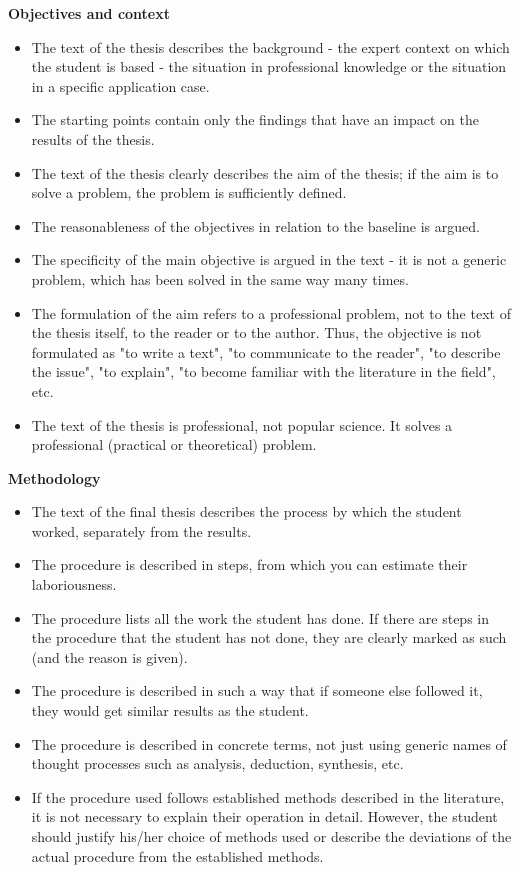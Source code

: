 {\bfseries\sffamily\Large Objectives and context}
\begin{itemize}
\item \vspace*{-2ex}The text of the thesis describes the background - the expert context on which the student is based - the situation in professional knowledge or the situation in a specific application case.
\item The starting points contain only the findings that have an impact on the results of the thesis.
\item The text of the thesis clearly describes the aim of the thesis; if the aim is to solve a problem, the problem is sufficiently defined.
\item The reasonableness of the objectives in relation to the baseline is argued.
\item The specificity of the main objective is argued in the text - it is not a generic problem, which has been solved in the same way many times.
\item The formulation of the aim refers to a professional problem, not to the text of the thesis itself, to the reader or to the author. Thus, the objective is not formulated as "to write a text", "to communicate to the reader", "to describe the issue", "to explain", "to become familiar with the literature in the field", etc.
\item The text of the thesis is professional, not popular science. It solves a professional (practical or theoretical) problem.
\end{itemize}

{\bfseries\sffamily\Large Methodology}
\begin{itemize}
\item \vspace*{-2ex}The text of the final thesis describes the process by which the student worked, separately from the results.
\item The procedure is described in steps, from which you can estimate their laboriousness.
\item The procedure lists all the work the student has done. If there are steps in the procedure that the student has not done, they are clearly marked as such (and the reason is given).
\item The procedure is described in such a way that if someone else followed it, they would get similar results as the student.
\item The procedure is described in concrete terms, not just using generic names of thought processes such as analysis, deduction, synthesis, etc.
\item If the procedure used follows established methods described in the literature, it is not necessary to explain their operation in detail. However, the student should justify his/her choice of methods used or describe the deviations of the actual procedure from the established methods.
\end{itemize}

